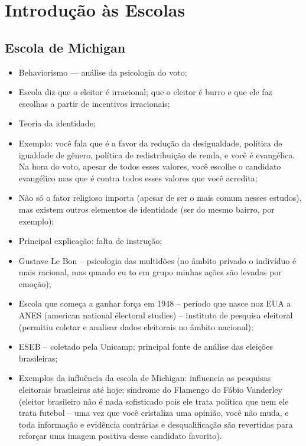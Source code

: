 \section{Introdução às Escolas}

\subsection{Escola de Michigan}
\begin{itemize}
    \item Behaviorismo --- análise da psicologia do voto;
    \item Escola diz que o eleitor é irracional; que o eleitor é burro e que ele faz escolhas a partir de incentivos irracionais;
    \item Teoria da identidade;
    \item Exemplo: você fala que é a favor da redução da desigualdade, política de igualdade de gênero, política de redistribuição de renda, e você é evangélica. Na hora do voto, apesar de todos esses valores, você escolhe o candidato evangélico mas que é contra todos esses valores que você acredita;
    \item Não só o fator religioso importa (apesar de ser o mais comum nesses estudos), mas existem outros elementos de identidade (ser do mesmo bairro, por exemplo);
    \item Principal explicação: falta de instrução;
    \item Gustave Le Bon – psicologia das multidões (no âmbito privado o indivíduo é mais racional, mas quando eu to em grupo minhas ações são levadas por emoção);
    \item Escola que começa a ganhar força em 1948 – período que nasce noz EUA a ANES (american national électoral studies) – instituto de pesquisa eleitoral (permitiu coletar e analisar dados eleitorais no âmbito nacional);
    \item ESEB – coletado pela Unicamp; principal fonte de análise das eleições brasileiras;
    \item Exemplos da influência da escola de Michigan: influencia as pesquisas eleitorais brasileiras até hoje; síndrome do Flamengo do Fábio Vanderley (eleitor brasileiro não é nada sofisticado pois ele trata política que nem ele trata futebol – uma vez que você cristaliza uma opinião, você não muda, e toda informação e evidência contrárias e desqualificação são revertidas para reforçar uma imagem positiva desse candidato favorito).
\end{itemize}

